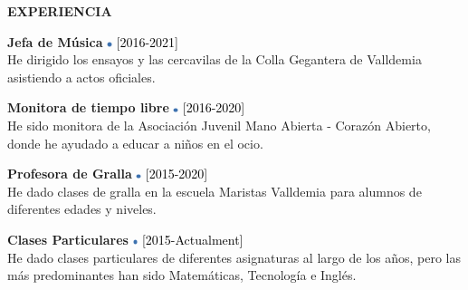 \documentclass[../main.tex]{subfiles}
\begin{document}
    \vspace*{0.5cm}
    \textbf{\textcolor{myCV2}{EXPERIENCIA\underline{\hspace{7.1cm}}}}
        \vspace*{0.3cm}
        
        \textbf{Jefa de Música}
        \includegraphics[width=0.15cm]{assets/full.png} 
        \textcolor{black}{[2016-2021]}\\
        He dirigido los ensayos y las cercavilas de la Colla Gegantera de Valldemia asistiendo a actos oficiales.
        
        \vspace*{0.25cm}
        \textbf{Monitora de tiempo libre}
        \includegraphics[width=0.15cm]{assets/full.png}
        \textcolor{black}{[2016-2020]}\\
        He sido monitora de la Asociación Juvenil Mano Abierta - Corazón Abierto, donde he ayudado a educar a niños en el ocio.
        
        \vspace*{0.25cm}
        \textbf{Profesora de Gralla}
        \includegraphics[width=0.15cm]{assets/full.png}
        \textcolor{black}{[2015-2020]} \\
        He dado clases de gralla en la escuela Maristas Valldemia para alumnos de diferentes edades y niveles.
        
        \vspace*{0.25cm}
        \textbf{Clases Particulares}
        \includegraphics[width=0.15cm]{assets/full.png}
        \textcolor{black}{[2015-Actualment]} \\
        He dado clases particulares de diferentes asignaturas al largo de los años, pero las más predominantes han sido Matemáticas, Tecnología e Inglés.
\end{document}
